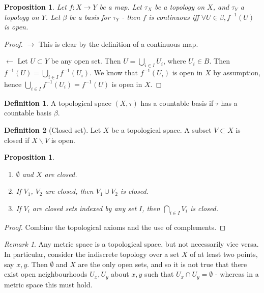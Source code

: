 \documentclass{article}
\theoremstyle{definition}
\newtheorem{defn}{Definition}[section]
\theoremstyle{plain}%
\newtheorem{prop}[thm]{Proposition}
\theoremstyle{remark}
\newtheorem*{rem}{Remark}
\newcommand{\union}{\cup}
\newcommand{\Union}{\bigcup}
\newcommand{\intersection}{\cap}
\newcommand{\Intersection}{\bigcap}
\begin{document}
\begin{prop}
Let $f: X \to Y$ be a map. Let $\tau_X$ be a topology on $X$, and $\tau_Y$ a topology on $Y$. Let $\beta$ be a basis for $\tau_Y$ - then $f$ is continuous iff $\forall U \in \beta, f^{-1}(U)$ is open. 
\end{prop}

\begin{proof}
$\rightarrow$ This is clear by the definition of a continuous map.

$\leftarrow$ Let $U \subset Y$ be any open set. Then $U = \Union_{i \in I} U_i$, where $U_i \in B$. Then $f^{-1}(U) = \Union_{i \in I} f^{-1}(U_i)$. We know that $f^{-1}(U_i)$ is open in $X$ by assumption, hence $\Union_{i \in I}f^{-1}(U_i) = f^{-1}(U)$ is open in $X$.
\end{proof}

\begin{defn}
A topological space $(X, \tau)$ has a countable basis if $\tau$ has a countable basis $\beta$.
\end{defn}

\begin{defn}[Closed set]
Let $X$ be a topological space. A subset $V \subset X$ is closed if $X \backslash V$ is open.
\end{defn}

\begin{prop}
\begin{enumerate}
    \item $\emptyset$ and $X$ are closed.
    \item If $V_1$, $V_2$ are closed, then $V_1 \union V_2$ is closed.
    \item If $V_i$ are closed sets indexed by any set $I$, then $\Intersection_{i \in I} V_i$ is closed.
\end{enumerate}
\end{prop}

\begin{proof}
Combine the topological axioms and the use of complements.
\end{proof}

\begin{rem}
    Any metric space is a topological space, but not necessarily vice versa. In particular, consider the indiscrete topology over a set $X$ of at least two points, say $x, y$. Then $\emptyset$ and $X$ are the only open sets, and so it is not true that there exist open neighbourhoods $U_x, U_y$ about $x, y$ such that $U_x \intersection U_y = \emptyset$ - whereas in a metric space this must hold.
\end{rem}
\end{document}
